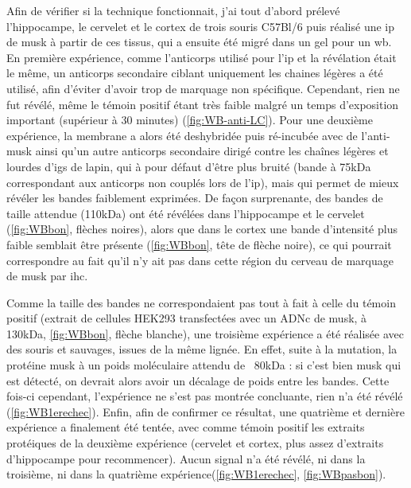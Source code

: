 	Afin de vérifier si la technique fonctionnait, j'ai tout d'abord prélevé l'hippocampe, le cervelet et le cortex de trois souris C57Bl/6 puis réalisé une \gls{ip} de \gls{musk} à partir de ces tissus, qui a ensuite été migré dans un gel pour un \gls{wb}. En première expérience, comme l'anticorps utilisé pour l'\gls{ip} et la révélation était le même, un anticorps secondaire ciblant uniquement les chaines légères a été utilisé, afin d'éviter d'avoir trop de marquage non spécifique. Cependant, rien ne fut révélé, même le témoin positif étant très faible malgré un temps d'exposition important (supérieur à 30 minutes) (\cref{fig:WB-anti-LC}). Pour une deuxième expérience, la membrane a alors été deshybridée puis ré-incubée avec de l'anti-\gls{musk} ainsi qu'un autre anticorps secondaire dirigé contre les chaînes légères et lourdes d'\Glspl{ig} de lapin, qui à pour défaut d'être plus bruité (bande à 75kDa correspondant aux anticorps non couplés lors de l'\gls{ip}), mais qui permet de mieux révéler les bandes faiblement exprimées. De façon surprenante, des bandes de taille attendue (110kDa) ont été révélées dans l'hippocampe et le cervelet (\cref{fig:WBbon}, flèches noires), alors que dans le cortex une bande d'intensité plus faible semblait être présente (\cref{fig:WBbon}, tête de flèche noire), ce qui pourrait correspondre au fait qu'il n'y ait pas dans cette région du cerveau de marquage de \gls{musk} par \gls{ihc}. 
	
	Comme la taille des bandes ne correspondaient pas tout à fait à celle du témoin positif (extrait de cellules HEK293 transfectées avec un ADNc de \gls{musk}, à 130kDa, \cref{fig:WBbon}, flèche blanche), une troisième expérience a été réalisée avec des souris \mcrd et sauvages, issues de la même lignée. En effet, suite à la mutation, la protéine \gls{musk} à un poids moléculaire attendu de ~80kDa : si c'est bien \gls{musk} qui est détecté, on devrait alors avoir un décalage de poids entre les bandes. Cette fois-ci cependant, l'expérience ne s'est pas montrée concluante, rien n'a été révélé (\cref{fig:WB1erechec}). Enfin, afin de confirmer ce résultat, une quatrième et dernière expérience a finalement été tentée, avec comme témoin positif les extraits protéiques de la deuxième expérience (cervelet et cortex, plus assez d'extraits d'hippocampe pour recommencer). Aucun signal n'a été révélé, ni dans la troisième, ni dans la quatrième expérience(\cref{fig:WB1erechec}, \cref{fig:WBpasbon}).
	
